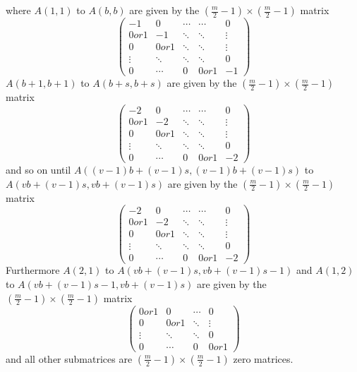 \documentclass[10pt,a4paper]{report}
\theoremstyle{definition}
\theoremstyle{remark}
\theoremstyle{example}
\begin{document}
where $A(1,1)$ to $ A(b,b)$ are given by the $(\frac{m}{2}-1)\times (\frac{m}{2}-1)$ matrix
\begin{equation*}
\left( \begin{array}{ccccc}
-1 & 0 & \cdots & \cdots & 0 \\
0 or 1 & -1 & \ddots & \ddots & \vdots \\
0 & 0 or 1 & \ddots & \ddots & \vdots \\
\vdots & \ddots & \ddots &  \ddots & 0 \\
0 & \cdots & 0 & 0 or 1 & -1
\end{array} \right)
\end{equation*}
$A(b+1,b+1)$ to $ A(b+s,b+s)$ are given by the $(\frac{m}{2}-1)\times (\frac{m}{2}-1)$ matrix
\begin{equation*}
\left( \begin{array}{ccccc}
-2 & 0 & \cdots & \cdots & 0 \\
0 or 1 & -2 & \ddots & \ddots & \vdots \\
0 & 0 or 1 & \ddots & \ddots & \vdots \\
\vdots & \ddots & \ddots &  \ddots & 0 \\
0 & \cdots & 0 & 0 or 1 & -2
\end{array} \right)
\end{equation*}
and so on until
$A((v-1)b+(v-1)s,(v-1)b+(v-1)s)$ to $A(vb+(v-1)s,vb+(v-1)s)$ are given by the $(\frac{m}{2}-1)\times (\frac{m}{2}-1)$ matrix
\begin{equation*}
\left( \begin{array}{ccccc}
-2 & 0 & \cdots & \cdots & 0 \\
0 or 1 & -2 & \ddots & \ddots & \vdots \\
0 & 0 or 1 & \ddots & \ddots & \vdots \\
\vdots & \ddots & \ddots &  \ddots & 0 \\
0 & \cdots & 0 & 0 or 1 & -2
\end{array} \right)
\end{equation*}
Furthermore $A(2,1)$ to $A(vb+(v-1)s,vb+(v-1)s-1)$ and $A(1,2)$ to $A(vb+(v-1)s-1,vb+(v-1)s)$ are given by the $(\frac{m}{2}-1)\times (\frac{m}{2}-1)$ matrix
\begin{equation*}
\left( \begin{array}{cccc}
0 or 1 & 0 & \cdots & 0 \\
0 & 0 or 1 & \ddots & \vdots \\
\vdots & \ddots & \ddots & 0 \\
0 & \cdots & 0 & 0 or 1
\end{array} \right)
\end{equation*}
and all other submatrices are $(\frac{m}{2}-1)\times (\frac{m}{2}-1)$ zero matrices.
\end{document}
